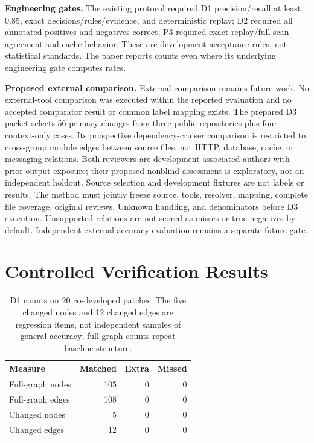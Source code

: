 \documentclass[conference]{IEEEtran}
\begin{document}
\textbf{Engineering gates.} The existing protocol required D1 precision/recall at least 0.85, exact decisions/rules/evidence, and deterministic replay; D2 required all annotated positives and negatives correct; P3 required exact replay/full-scan agreement and cache behavior. These are development acceptance rules, not statistical standards. The paper reports counts even where its underlying engineering gate computes rates.

\textbf{Proposed external comparison.} External comparison remains future work. No external-tool comparison was executed within the reported evaluation and no accepted comparator result or common label mapping exists. The prepared D3 packet selects 56 primary changes from three public repositories plus four context-only cases. Its prospective dependency-cruiser comparison is restricted to cross-group module edges between source files, not HTTP, database, cache, or messaging relations. Both reviewers are development-associated authors with prior output exposure; their proposed nonblind assessment is exploratory, not an independent holdout. Source selection and development fixtures are not labels or results. The method must jointly freeze source, tools, resolver, mapping, complete file coverage, original reviews, Unknown handling, and denominators before D3 execution. Unsupported relations are not scored as misses or true negatives by default. Independent external-accuracy evaluation remains a separate future gate.

\section{Controlled Verification Results}

\begin{table}[t]
  \caption{D1 counts on 20 co-developed patches. The five changed nodes and 12 changed edges are regression items, not independent samples of general accuracy; full-graph counts repeat baseline structure.}
  \label{tab:detection-results}
  \centering
  \small
  \begin{tabular}{lrrr}
    \hline
    Measure & Matched & Extra & Missed \\
    \hline
    Full-graph nodes & 105 & 0 & 0 \\
    Full-graph edges & 108 & 0 & 0 \\
    Changed nodes & 5 & 0 & 0 \\
    Changed edges & 12 & 0 & 0 \\
    \hline
  \end{tabular}
\end{table}
\end{document}

